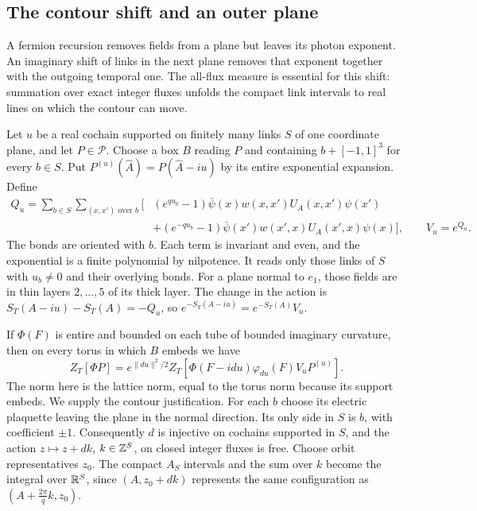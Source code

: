 \subsection{The contour shift and an outer plane}\label{subsec:diag-contour}

A fermion recursion removes fields from a plane but leaves its
photon exponent. An imaginary shift of links in the next plane
removes that exponent together with the outgoing temporal one.
The all-flux measure is essential for this shift: summation over
exact integer fluxes unfolds the compact link intervals to
real lines on which the contour can move.

Let $u$ be a real cochain supported on finitely many links $S$
of one coordinate plane, and let $P\in\mathcal P$. Choose a
box $B$ reading $P$ and containing $b+[-1,1]^3$ for every
$b\in S$. Put $P^{(u)}(\widehat A)=P(\widehat A-iu)$ by
its entire exponential expansion. Define
\begin{equation}\label{eq:diag-shift-fermion-polynomial}
 \begin{split}
 Q_u=\sum_{b\in S}\sum_{(x,x')\text{ over }b}\big[&
 (e^{qu_b}-1)\bar\psi(x)w(x,x')U_A(x,x')\psi(x')\\
 &+(e^{-qu_b}-1)\bar\psi(x')w(x',x)U_A(x',x)\psi(x)\big],
 \qquad V_u=e^{Q_u}.
 \end{split}
\end{equation}
The bonds are oriented with $b$. Each term is invariant and
even, and the exponential is a finite polynomial by nilpotence.
It reads only those links of $S$ with $u_b\ne0$ and their
overlying bonds. For a plane normal to $e_1$, those fields
are in thin layers $2,\ldots,5$ of its thick layer. The change
in the action is $S_T(A-iu)-S_T(A)=-Q_u$, so
$e^{-S_T(A-iu)}=e^{-S_T(A)}V_u$.

If $\Phi(F)$ is entire and bounded on each tube of bounded
imaginary curvature, then on every torus in which $B$ embeds
we have
\begin{equation}\label{eq:diag-contour-identity}
 Z_T[\Phi P]=e^{\|du\|^2/2}
       Z_T[\Phi(F-idu)\varphi_{du}(F)V_uP^{(u)}].
\end{equation}
The norm here is the lattice norm, equal to the torus norm
because its support embeds. We supply the contour justification.
For each $b$ choose its electric plaquette leaving the plane
in the normal direction. Its only side in $S$ is $b$, with
coefficient $\pm1$. Consequently $d$ is injective on cochains
supported in $S$, and the action
$z\mapsto z+dk$, $k\in\mathbb Z^S$, on closed integer fluxes is free.
Choose orbit representatives $z_0$. The compact $A_S$ intervals
and the sum over $k$ become the integral over $\mathbb R^S$, since
$(A,z_0+dk)$ represents the same configuration as
$(A+\frac{2\pi}{q}k,z_0)$.

